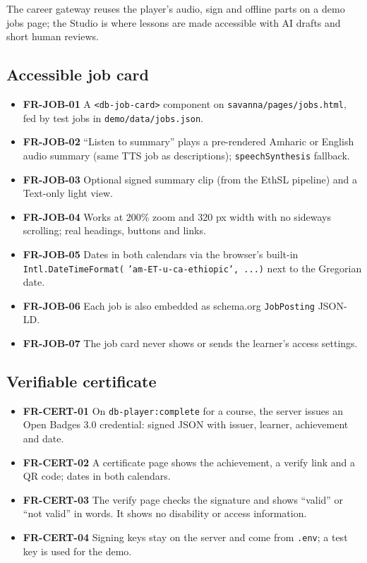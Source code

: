 \documentclass[11pt,a4paper]{article}
\newcommand{\code}[1]{\texttt{#1}}
\newcommand{\req}[1]{\textbf{#1}}
\begin{document}
The career gateway reuses the player's audio, sign and offline parts on a demo jobs page; the Studio is where lessons are made accessible with AI drafts and short human reviews.

\subsection{Accessible job card}
\begin{itemize}
  \item \req{FR-JOB-01} A \code{<db-job-card>} component on \code{savanna/pages/jobs.html}, fed by test jobs in \code{demo/data/jobs.json}.
  \item \req{FR-JOB-02} ``Listen to summary'' plays a pre-rendered Amharic or English audio summary (same TTS job as descriptions); \code{speechSynthesis} fallback.
  \item \req{FR-JOB-03} Optional signed summary clip (from the EthSL pipeline) and a Text-only light view.
  \item \req{FR-JOB-04} Works at 200\% zoom and 320 px width with no sideways scrolling; real headings, buttons and links.
  \item \req{FR-JOB-05} Dates in both calendars via the browser's built-in \code{Intl.\allowbreak DateTimeFormat(} \code{'am-ET-u-ca-ethiopic', ...)} next to the Gregorian date.
  \item \req{FR-JOB-06} Each job is also embedded as schema.org \code{JobPosting} JSON-LD.
  \item \req{FR-JOB-07} The job card never shows or sends the learner's access settings.
\end{itemize}

\subsection{Verifiable certificate}
\begin{itemize}
  \item \req{FR-CERT-01} On \code{db-player:complete} for a course, the server issues an Open Badges 3.0 credential: signed JSON with issuer, learner, achievement and date.
  \item \req{FR-CERT-02} A certificate page shows the achievement, a verify link and a QR code; dates in both calendars.
  \item \req{FR-CERT-03} The verify page checks the signature and shows ``valid'' or ``not valid'' in words. It shows no disability or access information.
  \item \req{FR-CERT-04} Signing keys stay on the server and come from \code{.env}; a test key is used for the demo.
\end{itemize}
\end{document}
